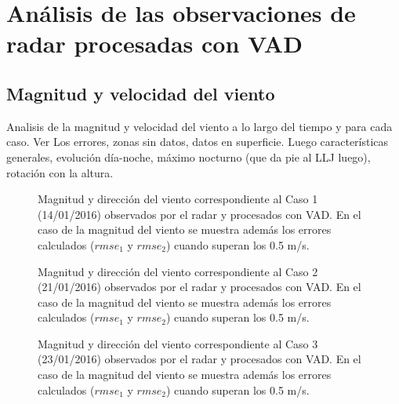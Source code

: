 \documentclass[12pt,spanish,oneside]{book}
\begin{document}
\section{Análisis de las observaciones de radar procesadas con
VAD}\label{analisis-de-las-observaciones-de-radar-procesadas-con-vad}

\subsection{Magnitud y velocidad del
viento}\label{magnitud-y-velocidad-del-viento}

Analisis de la magnitud y velocidad del viento a lo largo del tiempo y
para cada caso. Ver Los errores, zonas sin datos, datos en superficie.
Luego características generales, evolución día-noche, máximo nocturno
(que da pie al LLJ luego), rotación con la altura.

\begin{figure}
\newline{}\caption{Magnitud y dirección del viento  correspondiente al Caso 1 (14/01/2016) observados por el radar y procesados con VAD. En el caso de la magnitud del viento se muestra además los errores calculados ($rmse_1$ y $rmse_2$) cuando superan los 0.5 m/s. \label{campo-caso1}}\label{fig:campo-caso1}
\end{figure}

\begin{figure}
\newline{}\caption{Magnitud y dirección del viento  correspondiente al Caso 2 (21/01/2016) observados por el radar y procesados con VAD. En el caso de la magnitud del viento se muestra además los errores calculados ($rmse_1$ y $rmse_2$) cuando superan los 0.5 m/s. \label{campo-caso2}}\label{fig:campo-caso2}
\end{figure}

\begin{figure}
\newline{}\caption{Magnitud y dirección del viento  correspondiente al Caso 3 (23/01/2016) observados por el radar y procesados con VAD. En el caso de la magnitud del viento se muestra además los errores calculados ($rmse_1$ y $rmse_2$) cuando superan los 0.5 m/s. \label{campo-caso3}}\label{fig:campo-caso3}
\end{figure}
\end{document}
